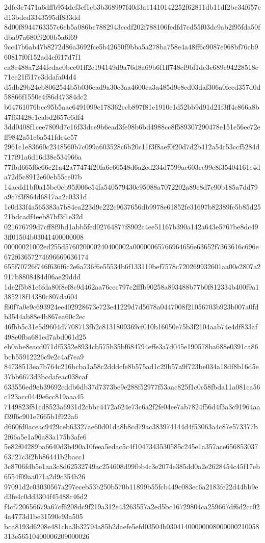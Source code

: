 {2dfe3c7471a6dffb954dcf3cf1cb3b368997f40d3a11410142252f62811db11df2bc34f657cd13bded3343595df833dd
8d00f8944763357c6cb5a086bc7882943ccdf202f788106fedfd7cd55f03dc9ab2f95fda50fdba97a680f9200b5a6f69
9cc47b6ab47b8272d86a3692fce5b42650f9bba5a278ba758e4a48ff6c9087e968bf76cb960817f0f152ad4ef617d7f1
ea8c488a7244fcdae0bcc01ff2e194149d9a76d8a69b6f1ff748cf9bf1dc3c689c94228518e71ec21f517e3ddafa04d4
d5db29b24eb8062544b5b036ead9a30e3aa4600ca3a485d9e8ed03daf306a0fccd357d0d58866f1550e4f86d47384dc2
b64761076bcc95b5aac6491099c178362ccb897f81e1910e1d52bb9d91d21f3ff4c866a8b47f63428e1cabd2657e6df4
3dd0408f1cee7809d7c16f33dce9b6ead3fe98b6bd4988cc8f589307290478e151e56ec72eff9842a51c6a541fdc4e57
2961c1e83660c2348560b7c099a603528c6b20c11f3f8aef0f20d7d2b412a54c53ccf5284d717f91a6d16d38e534966a
77fbd665f6c66c21a42a77474f20fa6c66548d6a2ed234d7599ac603ce99c8f35404161e4da72d5c8912e60eb55ce07b
14acdd1bf0a15be0cb95f006e54fa540579430e95088a7072202a89e8d7e90b185a7dd79a9c7f3f864d6817aa2c0331d
1c0d33f4a565383a7b84ea223d9c222c9637656db9978e61852fe31697b82389fe5b85d2521bdcadf4eeb87bf3f1e32d
021676799d7cff8f9bd1abb5fed02764877f8902c4ee51167b390a142a643e5767be8dc493ff01504b03041400000008
00000021002ed255d576020000240400002a00000065766964656e63652f7363616c696e672f63657274696669636174
655f70726f746f636f6c2e6a736f6e55534b6f133110bef7578c720269932601aa00e2807a2917b8808484d06ae29ddd
1de2f5b81e6fda80f8ef8c9d462aa76cec797c2fffb90258a893488b77b0f812334b400f9a1385218f14380c807da604
f60f7a0e9c693924ee402928673e723e41229d7d5678a0447008f21056703b923b007a0fdb3544ab88e4b867ea60c2ec
46fbb5c31e5d9604d7708713fb2c8131809369cf010b16050e75b3f2104aab74e4df833af498e0fba681cd7abd061d25
eb0abe8eacd071df5352e8934cb575b35bf684794effe3a7d045e190578ba688e0391ca86bcb55912226c9e2c4af7ea9
84738513ea7b764c216bcba1a58c2dddcfe8b575ad1c29b57a9f723be034a18df8b16d5e37bb6673d3bcdafeac038caf
633556ed9eb39692cddb6db37d7373be9e288f52977f53aac825f1c0c58fbda11a081ca56c123acc0449e6cc819aaa45
7149823f81cd8523a6931d2cbbc4472a624e73c6a2f2fe04ee7ab7824f56d4f3a3c91964aaf39f6c901e7665b1f922a6
d660fd0aceac9429ceb63327ae60d01da8b8cd79ac383974144d4f53063a4c87e573377b2f66a5e1a96a83a175b3afe6
5e82f04289ba6640d3b490a10feea5edac5c4f1047343530585c245e1a357ace65685303763727c3f2bb86441b2bacc1
3c8706fdb5e1aa3c8d62532749ac254608d99fbb4c3e2074e385dd0a2e2628454c45f17eb6554f09aa071a2d9c354b26
97091d2c03030567a297eceb53b250b570b11899b55fcb449c083ec6a2183fc22d44bb9ed3fe4c0dd3304f45488c46d2
f4cf720656679a67cf6208dc9f219a312e43263557a2ed5bc16729804ca259667df6d2cc024a4773d1be31590e93a505
bca8193d6208e481cba3b32794a85b2daefe5efd03504b03041400000008000000210058313e56510400006209000026
}
